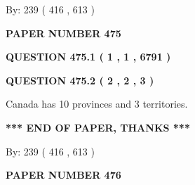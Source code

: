 \documentclass[12pt]{article}
\begin{document}
   
\hspace{1.0in} By: 
 239 ( 416 ,  613 )
   
   
   
   
\newpage 
\setcounter{page}{ 
   475001 } 
   
   
   
   
 {\textbf{ \Large{ PAPER NUMBER  475  }}}
   
   
\vspace{0.2in}
   
   
   
   
   
   
 \vspace{0.2in}
 
 
 
 
   
   
  
\vspace{0.2in}
  
{\textbf{\Large{QUESTION
475.1 
 ( 1 , 1 , 6791 )
}}}
  
  
  
\vspace{0.2in}
  
{\textbf{\Large{QUESTION
475.2 
 ( 2 , 2 , 3 )
}}}
  
  
 
 
\noindent{}
 
 
Canada has 10  provinces and 3 territories.
 
 
 
 
   
   
 \vspace{0.2in}
 
   
   
   
   
\vspace{1.0in} 
{\textbf{\large{ *** END OF PAPER, THANKS *** }}} 
   
   
\hspace{1.0in} By: 
 239 ( 416 ,  613 )
   
   
   
   
\newpage 
\setcounter{page}{ 
   476001 } 
   
   
   
   
 {\textbf{ \Large{ PAPER NUMBER  476  }}}
   
\end{document}
